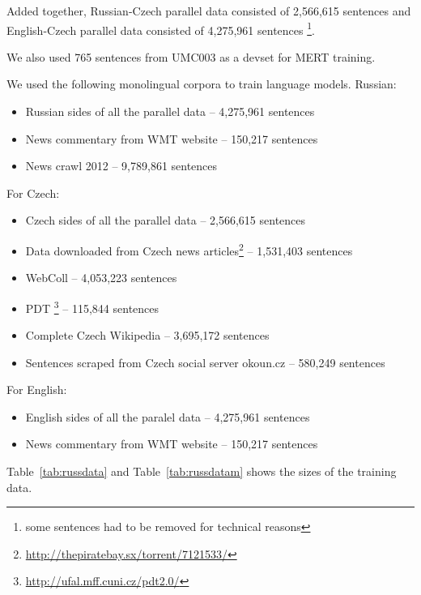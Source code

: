 \documentclass[11pt,letterpaper]{article}
\def\parcite#1{\cite{#1}}  %
\def\Tref#1{Table~\ref{#1}}
\def\parcite#1{\cite{#1}}
\begin{document}
Added together, Russian-Czech parallel data consisted of 2,566,615 sentences and English-Czech parallel data consisted of 4,275,961 sentences \footnote{some sentences had to be removed for technical reasons}.

We also used 765 sentences from UMC003 as a devset for MERT training.

We used the following monolingual corpora to train language models. Russian:

\begin{itemize}
\item Russian sides of all the parallel data -- 4,275,961 sentences
\item News commentary from WMT website -- 150,217 sentences
\item News crawl 2012 -- 9,789,861 sentences
\end{itemize}

For Czech:
\begin{itemize}
\item Czech sides of all the parallel data -- 2,566,615 sentences
\item Data downloaded from Czech news articles\footnote{\url{http://thepiratebay.sx/torrent/7121533/}} -- 1,531,403 sentences
\item WebColl \parcite{webcoll} -- 4,053,223 sentences
\item PDT \footnote{\url{http://ufal.mff.cuni.cz/pdt2.0/}} -- 115,844 sentences
\item Complete Czech Wikipedia -- 3,695,172 sentences
\item Sentences scraped from Czech social server okoun.cz -- 580,249 sentences
\end{itemize}

For English:
\begin{itemize}
\item English sides of all the paralel data -- 4,275,961 sentences
\item News commentary from WMT website -- 150,217 sentences
\end{itemize}

\Tref{tab:russdata} and \Tref{tab:russdatam} shows the sizes of the training data.
\end{document}
